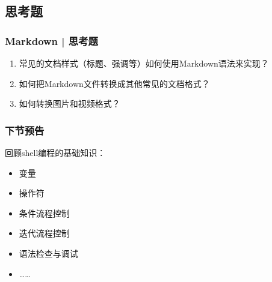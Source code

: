 \subsection{思考题}
\begin{frame}
  \frametitle{Markdown | 思考题}
  \begin{enumerate}
    \item 常见的文档样式（标题、强调等）如何使用Markdown语法来实现？
    \item 如何把Markdown文件转换成其他常见的文档格式？
    \item 如何转换图片和视频格式？
  \end{enumerate}
\end{frame}

\begin{frame}
  \frametitle{下节预告}
  回顾shell编程的基础知识：
  \begin{itemize}
    \item 变量
    \item 操作符
    \item 条件流程控制
    \item 迭代流程控制
    \item 语法检查与调试
    \item ……
  \end{itemize}
\end{frame}



